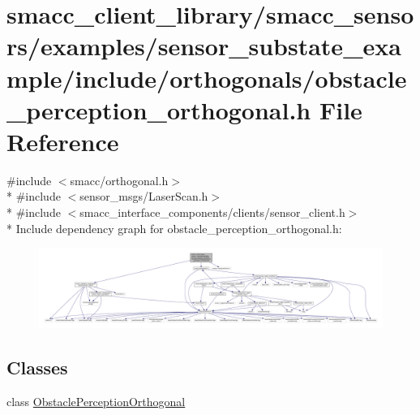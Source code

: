 \hypertarget{smacc__client__library_2smacc__sensors_2examples_2sensor__substate__example_2include_2orthogonala707cfaad3235c00883bb2c73667eac3}{}\section{smacc\+\_\+client\+\_\+library/smacc\+\_\+sensors/examples/sensor\+\_\+substate\+\_\+example/include/orthogonals/obstacle\+\_\+perception\+\_\+orthogonal.h File Reference}
\label{smacc__client__library_2smacc__sensors_2examples_2sensor__substate__example_2include_2orthogonala707cfaad3235c00883bb2c73667eac3}
{\ttfamily \#include $<$smacc/orthogonal.\+h$>$}\\*
{\ttfamily \#include $<$sensor\+\_\+msgs/\+Laser\+Scan.\+h$>$}\\*
{\ttfamily \#include $<$smacc\+\_\+interface\+\_\+components/clients/sensor\+\_\+client.\+h$>$}\\*
Include dependency graph for obstacle\+\_\+perception\+\_\+orthogonal.\+h\+:
\nopagebreak
\begin{figure}[H]
\begin{center}
\leavevmode
\includegraphics[width=350pt]{smacc__client__library_2smacc__sensors_2examples_2sensor__substate__example_2include_2orthogonalad58a0cf1488b5bfdaeca7cb81c372af}
\end{center}
\end{figure}
\subsection*{Classes}
\begin{DoxyCompactItemize}
\item 
class \hyperlink{classObstaclePerceptionOrthogonal}{Obstacle\+Perception\+Orthogonal}
\end{DoxyCompactItemize}
